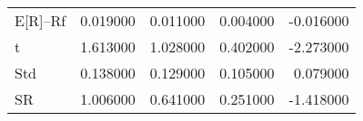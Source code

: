 \begin{tabular}{lrrrr}
\toprule
\midrule
E[R]--Rf & 0.019000 & 0.011000 & 0.004000 & -0.016000 \\
t & 1.613000 & 1.028000 & 0.402000 & -2.273000 \\
Std & 0.138000 & 0.129000 & 0.105000 & 0.079000 \\
SR & 1.006000 & 0.641000 & 0.251000 & -1.418000 \\
\bottomrule
\end{tabular}
